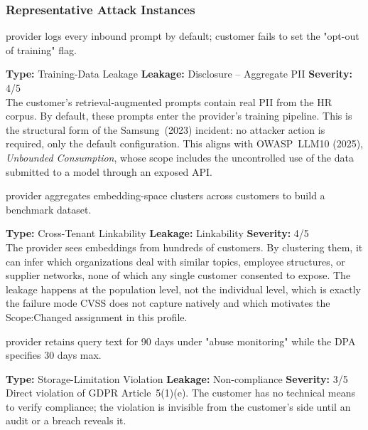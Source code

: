 \documentclass[12pt,a4paper]{report}
\begin{document}
\subsubsection{Representative Attack Instances}

\vspace{4pt}
\begin{attackbox}
  provider logs every inbound prompt by default;
        customer fails to set the "opt-out of training" flag.
\end{attackbox}
\begin{prosebox}
\small\textbf{Type:} Training-Data Leakage \quad
\textbf{Leakage:} Disclosure -- Aggregate PII \quad \textbf{Severity:} 4/5\\[2pt]
The customer's retrieval-augmented prompts contain real PII from the HR
corpus. By default, these prompts enter the provider's training pipeline.
This is the structural form of the Samsung~(2023) incident: no attacker
action is required, only the default configuration. This aligns with OWASP~LLM10 (2025),
\emph{Unbounded Consumption}, whose scope includes the uncontrolled use of the data
submitted to a model through an exposed API.
\end{prosebox}

\vspace{4pt}
\begin{attackbox}
  provider aggregates embedding-space
        clusters across customers to build a benchmark dataset.
\end{attackbox}
\begin{prosebox}
\small\textbf{Type:} Cross-Tenant Linkability \quad
\textbf{Leakage:} Linkability \quad \textbf{Severity:} 4/5\\[2pt]
The provider sees embeddings from hundreds of customers. By clustering
them, it can infer which organizations deal with similar topics, employee
structures, or supplier networks, none of which any single customer
consented to expose. The leakage happens at the population level, not
the individual level, which is exactly the failure mode CVSS does not
capture natively and which motivates the Scope:Changed assignment
in this profile.
\end{prosebox}

\vspace{4pt}
\begin{attackbox}
  provider retains query text for 90 days
        under "abuse monitoring" while the DPA specifies 30 days max.
\end{attackbox}
\begin{prosebox}
\small\textbf{Type:} Storage-Limitation Violation \quad
\textbf{Leakage:} Non-compliance \quad \textbf{Severity:} 3/5\\[2pt]
Direct violation of GDPR Article~5(1)(e). The customer has no technical
means to verify compliance; the violation is invisible from the customer's
side until an audit or a breach reveals it.
\end{prosebox}
\end{document}

